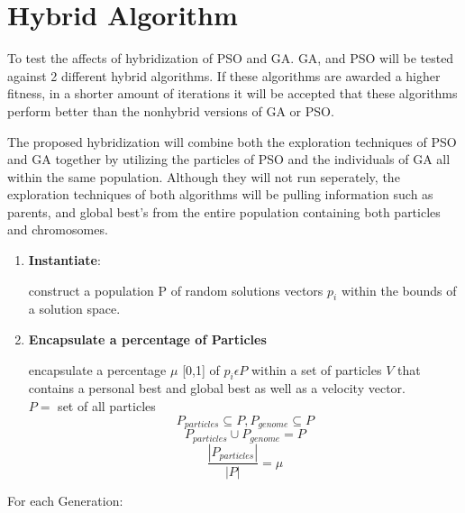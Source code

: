 \documentclass[twocolumn]{article}
\begin{document}
\section{Hybrid Algorithm}

To test the affects of hybridization of PSO and GA. GA, and PSO will be tested against 2 different hybrid algorithms. If these algorithms are awarded a higher fitness, in a shorter amount of iterations it will be accepted that these algorithms perform better than the nonhybrid versions of GA or PSO.

The proposed hybridization will combine both the exploration techniques of PSO and GA together by utilizing the particles of PSO and the individuals of GA all within the same population. Although they will not run seperately, the exploration techniques of both algorithms will be pulling information such as parents, and global best's from the entire population containing both particles and chromosomes.\\

\begin{enumerate}


    \item \textbf{Instantiate}:
    
construct a population P of random solutions vectors $p_i$ within the bounds of a solution space.

    \item \textbf{ Encapsulate a percentage of Particles}
    
encapsulate a percentage $\mu$ [0,1] of $p_i \epsilon P$ within a set of particles $V$ that contains a personal best and global best as well as a velocity vector. \\
$P = $ set of all particles
$$P_{particles} \subseteq P , P_{genome} \subseteq P $$
$$P_{particles} \cup P_{genome} = P$$
$$ \dfrac{|P_{particles}|}{|P|} = \mu$$


\end {enumerate}

For each Generation:
\end{document}
